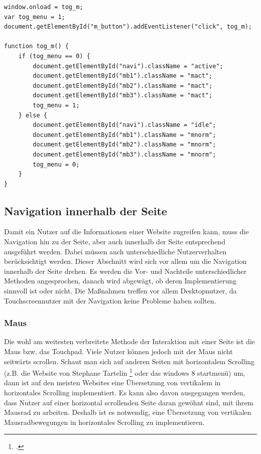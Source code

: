  \begin{lstlisting}[caption=Die Funktion tog\_m() öffnet bzw. schließt das Menü., label=js_menuevent]
window.onload = tog_m;
var tog_menu = 1;
document.getElementById("m_button").addEventListener("click", tog_m);

function tog_m() {
	if (tog_menu == 0) {
		document.getElementById("navi").className = "active";
		document.getElementById("mb1").className = "mact";
		document.getElementById("mb2").className = "mact";
		document.getElementById("mb3").className = "mact";
		tog_menu = 1;
	} else {
		document.getElementById("navi").className = "idle";
		document.getElementById("mb1").className = "mnorm";
		document.getElementById("mb2").className = "mnorm";
		document.getElementById("mb3").className = "mnorm";
		tog_menu = 0;
	}
}
\end{lstlisting} 

\subsection{Navigation innerhalb der Seite}
Damit ein Nutzer auf die Informationen einer Website zugreifen kann, muss die Navigation hin zu der Seite, aber auch innerhalb der Seite entsprechend ausgeführt werden. Dabei müssen auch unterschiedliche Nutzerverhalten berücksichtigt werden. Dieser Abschnitt wird sich vor allem um die Navigation innerhalb der Seite drehen. Es werden die Vor- und Nachteile unterschiedlicher Methoden angesprochen, danach wird abgewägt, ob deren Implementierung sinnvoll ist oder nicht.
Die Maßnahmen treffen vor allem Desktopnutzer, da Touchscreennutzer mit der Navigation keine Probleme haben sollten.
\subsubsection{Maus}
Die wohl am weitesten verbreitete Methode der Interaktion mit einer Seite ist die Maus bzw. das Touchpad. Viele Nutzer können jedoch mit der Maus nicht seitwärts scrollen. Schaut man sich auf anderen Seiten mit horizontalem Scrolling (z.B. die Website von Stephane Tartelin
\footcite[zu finden auf:][]{tartelin} oder das windows 8 startmenü) um, dann ist auf den meisten Websites eine Übersetzung von vertikalem in horizontales Scrolling implementiert. Es kann also davon ausgegangen werden, dass Nutzer auf einer horizontal scrollenden Seite daran gewöhnt sind, mit ihrem Mausrad zu arbeiten. Deshalb ist es notwendig, eine Übersetzung von vertikalen Mausradbewegungen in horizontales Scrolling zu implementieren. 
	
